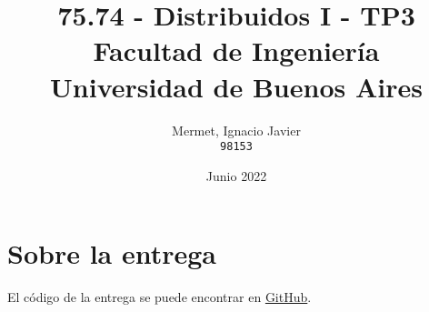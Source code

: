 \documentclass[titlepage,a4paper,oneside]{article}
\begin{document}
\begin{titlepage}
\title{
	75.74 \-- Distribuidos I \-- TP3\\
    \large Facultad de Ingeniería\\
	Universidad de Buenos Aires
}
\author{
	Mermet, Ignacio Javier\\
	\texttt{98153}
}
\date{Junio 2022}

\maketitle

\end{titlepage}

\tableofcontents

\newpage

\section{Sobre la entrega}
El código de la entrega se puede encontrar en \href{https://github.com/CrossNox/7574-TP3}{GitHub}.

\printbibliography
\end{document}
